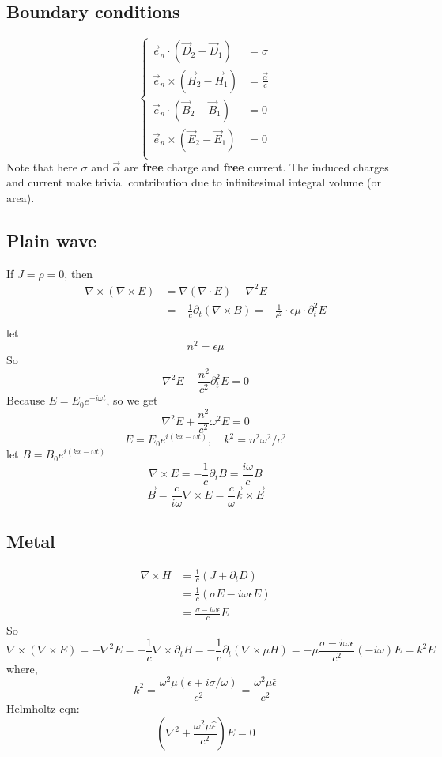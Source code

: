 \subsection{Boundary conditions}
\begin{equation}
    \left\{
	\begin{aligned}
	    \vec{e}_n \cdot (\vec{D}_2 - \vec{D}_1) &= \sigma    \\
	    \vec{e}_n \times (\vec{H}_2 - \vec{H}_1) &= \frac{\vec{\alpha}}{c}    \\
	    \vec{e}_n \cdot (\vec{B}_2 - \vec{B}_1) &= 0	\\
	    \vec{e}_n \times (\vec{E}_2 - \vec{E}_1) &= 0    \\
	\end{aligned}
	\right.
\end{equation}
Note that here $\sigma$ and $\vec{\alpha}$ are \textbf{free} charge and
\textbf{free} current. The induced charges and current make trivial
contribution due to infinitesimal integral volume (or area).
\subsection{Plain wave}
If $J = \rho = 0$, then
\[
    \begin{aligned}
    \nabla\times(\nabla\times{E}) &= \nabla(\nabla\cdot{E}) - \nabla^{2}E \\
	&=-\frac{1}{c}\partial_{t}(\nabla\times{B})
	=-\frac{1}{c^2}\cdot\epsilon\mu\cdot\partial^2_{t}E \\
    \end{aligned}
    \]
let 
\[ n^2=\epsilon\mu \]
So
\[
    \nabla^2{E}-\frac{n^2}{c^2}\partial^2_{t}E = 0 
    \]
Because $E = E_0e^{-i\omega{t}}$, so we get
\[
    \nabla^2{E}+\frac{n^2}{c^2}\omega^2E = 0 
    \]
\[
    E = E_0e^{i(kx-\omega{t})}, \quad k^2 = n^2\omega^2/c^2
    \]
let $B = B_0e^{i(kx-\omega{t})}$
\[
    \nabla\times{E} = -\frac{1}{c}\partial_{t}B = \frac{i\omega}{c}B
    \]
\[
    \vec{B}=\frac{c}{i\omega}\nabla\times{E}=\frac{c}{\omega}\vec{k}\times{\vec{E}}
    \]

\subsection{Metal}
\[
    \begin{aligned}
    \nabla\times{H}&=\frac{1}{c}(J+\partial_{t}D)   \\
    &=\frac{1}{c}(\sigma{E}-i\omega\epsilon{E})	\\
    &=\frac{\sigma-i\omega\epsilon}{c}E
    \end{aligned}
\]
So 
\[
    \nabla\times(\nabla\times{E})=-\nabla^2{E}=-\frac{1}{c}\nabla\times\partial_{t}B
    =-\frac{1}{c}\partial_{t}(\nabla\times{{\mu}H})
    =-\mu\frac{\sigma-i\omega\epsilon}{c^2}(-i\omega)E
    =k^2E
    \]
where,
\[
    k^2=\frac{\omega^2\mu(\epsilon+i\sigma/\omega)}{c^2}=\frac{\omega^2\mu\hat{\epsilon}}{c^2}
    \]
Helmholtz eqn:
\[
    (\nabla^2+\frac{\omega^2\mu\hat{\epsilon}}{c^2})E=0
    \]

